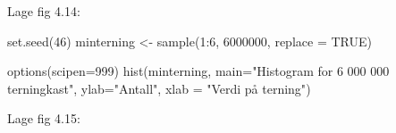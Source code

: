 \documentclass[
]{book}
\newenvironment{Shaded}{\begin{snugshade}}{\end{snugshade}}
\newcommand{\AttributeTok}[1]{\textcolor[rgb]{0.77,0.63,0.00}{#1}}
\newcommand{\ConstantTok}[1]{\textcolor[rgb]{0.00,0.00,0.00}{#1}}
\newcommand{\DecValTok}[1]{\textcolor[rgb]{0.00,0.00,0.81}{#1}}
\newcommand{\FunctionTok}[1]{\textcolor[rgb]{0.00,0.00,0.00}{#1}}
\newcommand{\NormalTok}[1]{#1}
\newcommand{\OtherTok}[1]{\textcolor[rgb]{0.56,0.35,0.01}{#1}}
\newcommand{\SpecialCharTok}[1]{\textcolor[rgb]{0.00,0.00,0.00}{#1}}
\newcommand{\StringTok}[1]{\textcolor[rgb]{0.31,0.60,0.02}{#1}}
\begin{document}
Lage fig 4.14:

\begin{Shaded}
\begin{Highlighting}[]
\FunctionTok{set.seed}\NormalTok{(}\DecValTok{46}\NormalTok{)}
\NormalTok{minterning }\OtherTok{\textless{}{-}} \FunctionTok{sample}\NormalTok{(}\DecValTok{1}\SpecialCharTok{:}\DecValTok{6}\NormalTok{, }\DecValTok{6000000}\NormalTok{, }\AttributeTok{replace =} \ConstantTok{TRUE}\NormalTok{)}

\FunctionTok{options}\NormalTok{(}\AttributeTok{scipen=}\DecValTok{999}\NormalTok{)}
\FunctionTok{hist}\NormalTok{(minterning,}
     \AttributeTok{main=}\StringTok{"Histogram for 6 000 000 terningkast"}\NormalTok{,}
     \AttributeTok{ylab=}\StringTok{"Antall"}\NormalTok{,}
     \AttributeTok{xlab =} \StringTok{"Verdi på terning"}\NormalTok{)}
\end{Highlighting}
\end{Shaded}

Lage fig 4.15:
\end{document}
